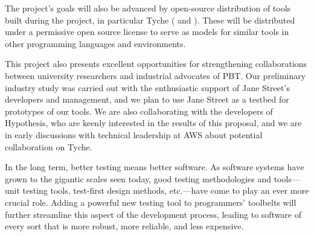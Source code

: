{\smallskip
{}
%
The project's goals will also be advanced by open-source distribution of tools
built during the project, in particular Tyche
( and
). These will be distributed under a permissive
open source license to serve as models for similar tools in other
programming languages and environments.

This project also presents excellent opportunities for strengthening
collaborations between university researchers and industrial advocates
of PBT.  Our preliminary industry study was carried out with the
enthusiastic support of Jane Street's developers and management, and we plan
to use Jane Street as a testbed for prototypes of our
tools.  We are also collaborating with the
developers of Hypothesis, who are keenly
interested in the results of this proposal, and we are in early
discussions with technical leadership at AWS about potential
collaboration on Tyche.

In the long term, better testing means better software.  As software
systems have grown to the gigantic scales seen today, good testing
methodologies and tools---unit testing tools, test-first design
methods, etc.---have come to play an ever more crucial role.  Adding a
powerful new testing tool to programmers' toolbelts will further streamline
this aspect of the development process, leading to software of every
sort that is more robust, more reliable, and less expensive. 




}
